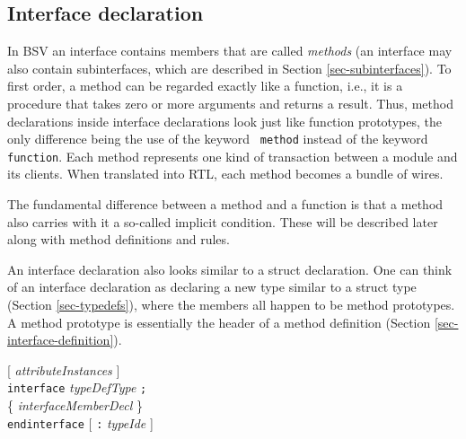 \documentclass[twoside,letterpaper]{article}
\newcommand{\hm}{\hspace*{1em}}
\newcommand{\hmm}{\hspace*{2em}}
\newcommand{\BSV}{BSV}
\newcommand{\nterm}[1]{\emph{#1}}
\newcommand{\term}[1]{\texttt{#1}}
\newcommand{\many}[1]{\{ #1 \}}
\newcommand{\opt}[1]{[ #1 ]}
\newcommand{\gram}[2]{    \hm\makebox[10em][l]{\it #1}\makebox[1.5em][l]{::=}    #2}
\newcommand{\grammore}[1]{\hm\makebox[10em][l]{      }\makebox[1.5em][l]{}       #1}
\begin{document}

\subsection{Interface declaration}

\label{sec-interface-decl}

 In {\BSV} an interface contains members that
are called \emph{methods}
(an interface may also contain subinterfaces, which are described in
Section \ref{sec-subinterfaces}).  To first order, a method can be
regarded exactly like a function, i.e., it is a procedure that takes
zero or more arguments and returns a result.  Thus, method
declarations inside interface declarations look just like function
prototypes, the only difference being the use of the keyword {\tt
method} instead of the keyword \texttt{function}.  Each method represents
one kind of transaction between a module and its clients.  When
translated into RTL, each method becomes a bundle of wires.

The fundamental difference between a method and a function is that a
method also carries with it a so-called implicit condition.  These
will be described later along with method definitions and rules.

An interface declaration also looks similar to a struct declaration.
One can think of an interface declaration as declaring a new type
similar to a struct type (Section \ref{sec-typedefs}), where the members all happen to be method
prototypes.  A method prototype is essentially the header of a method
definition (Section \ref{sec-interface-definition}). 

\gram{interfaceDecl} {\opt{ \nterm{attributeInstances} }  }  \\
\grammore           { \term{interface} \nterm{typeDefType} \term{;} } \\
\grammore           { \hmm \many{ \nterm{interfaceMemberDecl} } } \\
\grammore           { \term{endinterface} \opt{ \term{:} \nterm{typeIde} } }

\end{document}
